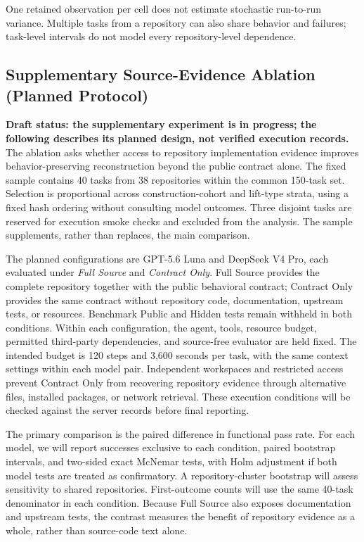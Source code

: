 \documentclass[acmsmall,screen,review,anonymous,nonacm]{acmart}
\begin{document}
One retained observation per cell does not estimate stochastic run-to-run
variance. Multiple tasks from a repository can also share behavior and failures;
task-level intervals do not model every repository-level dependence.

\subsection{Supplementary Source-Evidence Ablation (Planned Protocol)}
\label{sec:source-ablation-protocol}

\noindent\textbf{Draft status: the supplementary experiment is in progress;
the following describes its planned design, not verified execution records.}
The ablation asks whether access to repository implementation evidence improves
behavior-preserving reconstruction beyond the public contract alone. The fixed
sample contains 40 tasks from 38 repositories within the common 150-task set.
Selection is proportional across construction-cohort and lift-type strata,
using a fixed hash ordering without consulting model outcomes. Three disjoint
tasks are reserved for execution smoke checks and excluded from the analysis.
The sample supplements, rather than replaces, the main comparison.

The planned configurations are GPT-5.6 Luna and DeepSeek V4 Pro, each evaluated
under \emph{Full Source} and \emph{Contract Only}. Full Source provides the
complete repository together with the public behavioral contract; Contract Only
provides the same contract without repository code, documentation, upstream
tests, or resources. Benchmark Public and Hidden tests remain withheld in both
conditions. Within each configuration, the agent, tools, resource budget,
permitted third-party dependencies, and source-free evaluator are held fixed.
The intended budget is 120 steps and 3,600 seconds per task, with the same
context settings within each model pair. Independent workspaces and restricted
access prevent Contract Only from recovering repository evidence through
alternative files, installed packages, or network retrieval. These execution
conditions will be checked against the server records before final reporting.

The primary comparison is the paired difference in functional pass rate.
For each model, we will report successes exclusive to each condition,
paired bootstrap intervals, and two-sided exact McNemar tests, with Holm
adjustment if both model tests are treated as confirmatory. A repository-cluster
bootstrap will assess sensitivity to shared repositories. First-outcome counts
will use the same 40-task denominator in each condition. Because Full Source
also exposes documentation and upstream tests, the contrast measures the
benefit of repository evidence as a whole, rather than source-code text alone.
\end{document}
